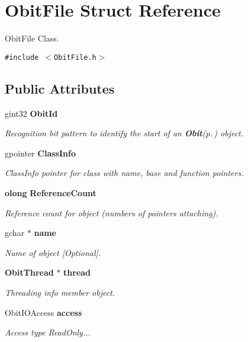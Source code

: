 \section{Obit\-File Struct Reference}
\label{structObitFile}
Obit\-File Class.  


{\tt \#include $<$Obit\-File.h$>$}

\subsection*{Public Attributes}
\begin{CompactItemize}
\item 
gint32 {\bf Obit\-Id}
\begin{CompactList}\small\item\em Recognition bit pattern to identify the start of an {\bf Obit}{\rm (p.\,\pageref{structObit})} object. \item\end{CompactList}\item 
gpointer {\bf Class\-Info}
\begin{CompactList}\small\item\em Class\-Info pointer for class with name, base and function pointers. \item\end{CompactList}\item 
{\bf olong} {\bf Reference\-Count}
\begin{CompactList}\small\item\em Reference count for object (numbers of pointers attaching). \item\end{CompactList}\item 
gchar $\ast$ {\bf name}
\begin{CompactList}\small\item\em Name of object [Optional]. \item\end{CompactList}\item 
{\bf Obit\-Thread} $\ast$ {\bf thread}
\begin{CompactList}\small\item\em Threading info member object. \item\end{CompactList}\item 
Obit\-IOAccess {\bf access}
\begin{CompactList}\small\item\em Access type Read\-Only... \item\end{CompactList}\item 

\end{CompactItemize}
